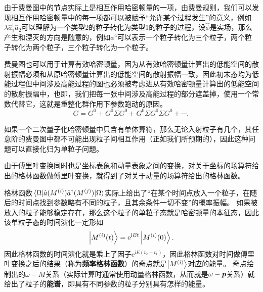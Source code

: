 \documentclass[hyperref, UTF8, a4paper]{ctexart}
\newcommand*{\ii}{\mathrm{i}}
\newcommand*{\ee}{\mathrm{e}}
\begin{document}
由于费曼图中的节点实际上是相互作用哈密顿量的一项，由费曼规则，我们可以发现相互作用哈密顿量中的每一项都可以被赋予“允许某个过程发生”的意义，例如$\lambda \hat{a}_1^\dagger \hat{a}_2$可以理解为一个类型2的粒子转化为类型1的粒子的过程，设$\hat{\phi}$是实场，那么产生和湮灭的方向是随意的，例如$\phi^4$可以表示一个粒子转化为三个粒子，两个粒子转化为两个粒子，三个粒子转化为一个粒子。%

费曼图也可以用于计算有效哈密顿量，因为从有效哈密顿量计算出的低能空间的散射振幅必须和从原哈密顿量计算出的低能空间的散射振幅一致，因此初末态均为低能过程但中间涉及高能过程的图也必须被考虑进从有效哈密顿量计算出的低能空间的散射振幅中，也即，我们把每一张中间涉及高能过程的部分遮盖掉，使用一个常数代替它，这就是重整化群作用下参数跑动的原因。
\[
    G = G^0 + G^0 \Sigma G^0 + G^0 \Sigma G^0 \Sigma G^0 + \cdots,
\]

如果一个二次量子化哈密顿量中只含有单体算符，那么无论入射粒子有几个，其任意阶的费曼图中都不可能出现粒子间相互作用（正如我们所预期的），因此这种问题可以直接化归为单粒子问题。


由于傅里叶变换同时也是坐标表象和动量表象之间的变换，对关于坐标的场算符给出的格林函数做傅里叶变换，就得到了对关于动量的场算符给出的格林函数。

格林函数$\mel{\Omega}{\hat{a}(M^{(i)})\hat{a}^\dagger(M^{(j)})}{\Omega}$实际上给出了“在某个时间点放入一个粒子，在随后的时间点找到参数略有不同的粒子，且其余条件一切不变”的概率振幅。
如果被放入的粒子能够稳定存在，那么这个粒子的单粒子态就是哈密顿量的本征态，因此该单粒子态的时间演化一定形如
\[
    \ket{M^{(i)}(t)} = \ee^{\ii E t} \ket{M^{(i)}(0)}.
\]
因此格林函数的时间演化就是乘上了因子$\ee^{\ii E (t_2 - t_1)}$，因此格林函数对时间做傅里叶变换之后的结果（称为\textbf{频率格林函数}）的奇点就是$\ket{M^{(i)}}$对应的能量。
奇点绘制出的$\omega-M$关系（实际计算时通常使用动量格林函数，从而就是$\omega - \vb*{p}$关系）就给出了粒子的\textbf{能谱}，即具有不同参数的粒子分别具有怎样的能量。
\end{document}
